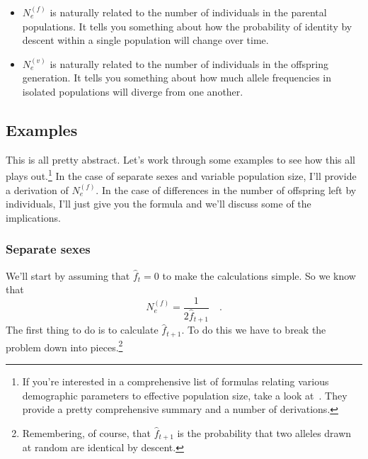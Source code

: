 \begin{itemize}

\item $N_e^{(f)}$ is naturally related to the number of individuals in
the parental populations. It tells you something about how the
probability of identity by descent within a single population will
change over time.

\item $N_e^{(v)}$ is naturally related to the number of individuals in
the offspring generation. It tells you something about how much allele
frequencies in isolated populations will diverge from one another.

\end{itemize}

\subsection*{Examples}

This is all pretty abstract. Let's work through some examples to see
how this all plays out.\footnote{If you're interested in a
  comprehensive list of formulas relating various demographic
  parameters to effective population size, take a look
  at~\cite[p. 362]{Crow-Kimura-1970}. They provide a pretty
  comprehensive summary and a number of derivations.} In the case of
separate sexes and variable population size, I'll provide a derivation
of $N_e^{(f)}$. In the case of differences in the number of offspring
left by individuals, I'll just give you the formula and we'll discuss
some of the implications.

\subsubsection*{Separate sexes}

We'll start by assuming that $\hat f_t = 0$ to make the calculations
simple. So we know that
\[
N_e^{(f)} = \frac{1}{2\hat f_{t+1}} \quad .
\]
The first thing to do is to calculate $\hat f_{t+1}$. To do this we
have to break the problem down into pieces.\footnote{Remembering, of
course, that $\hat f_{t+1}$ is the probability that two alleles drawn
at random are identical by descent.}


